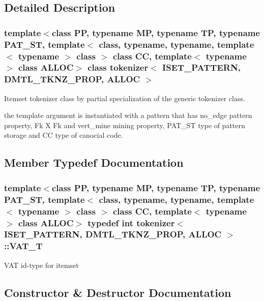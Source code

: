 \subsection{Detailed Description}
\subsubsection*{template$<$class PP, typename MP, typename TP, typename PAT\_\-ST, template$<$ class, typename, typename, template$<$ typename $>$ class $>$ class CC, template$<$ typename $>$ class ALLOC$>$ class tokenizer$<$ ISET\_\-PATTERN, DMTL\_\-TKNZ\_\-PROP, ALLOC $>$}

Itemset tokenizer class by partial specialization of the generic tokenizer class. 

the template argument is instantiated with a pattern that has no\_\-edge pattern property, Fk X Fk and vert\_\-mine mining property, PAT\_\-ST type of pattern storage and CC type of canocial code. 



\subsection{Member Typedef Documentation}
\subsubsection{\setlength{\rightskip}{0pt plus 5cm}template$<$class PP, typename MP, typename TP, typename PAT\_\-ST, template$<$ class, typename, typename, template$<$ typename $>$ class $>$ class CC, template$<$ typename $>$ class ALLOC$>$ typedef int \bf{tokenizer}$<$ ISET\_\-PATTERN, DMTL\_\-TKNZ\_\-PROP, ALLOC $>$::\bf{VAT\_\-T}}\label{classtokenizer_3_01ISET__PATTERN_00_01DMTL__TKNZ__PROP_00_01ALLOC_01_4_44bbfa02daea852ad122585be39c455d}


VAT id-type for itemset 

\subsection{Constructor \& Destructor Documentation}
